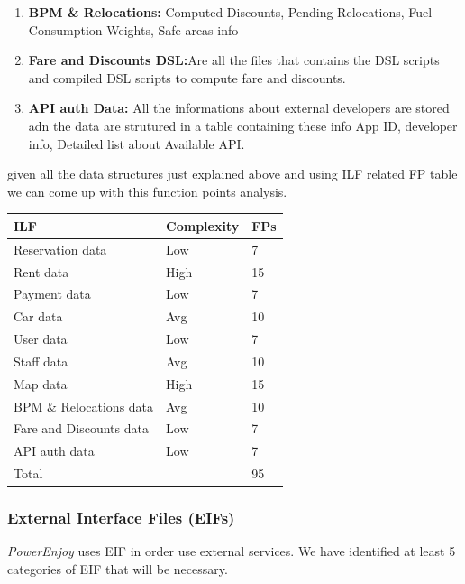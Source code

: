 \documentclass[english]{article}
\newenvironment{fpcounttable}[1]{
	\begin{center}
	\begin{longtable}{|l|l|l|}
	\hline 
	#1 & Complexity & FPs \\\hline
}{
	\end{longtable}\end{center}
}
\newcommand{\fptotal}[1]{
	\multicolumn{2}{|l|}{{Total}}
	& #1\\\hline
}
\newcommand{\powerenjoy}{\textit{PowerEnjoy }}
\newcommand{\ilh}{ & High & 15}
\newcommand{\ila}{ & Avg & 10}
\newcommand{\ill}{ & Low & 7}
\begin{document}
\begin {enumerate}
\begin{figure}[H]
				\caption{Map data Structure}
				\label{fig:mapStruct}
			\end{figure}
	\item  \textbf{BPM \& Relocations:} Computed Discounts, Pending Relocations, Fuel Consumption Weights, Safe areas info 
	\item  \textbf{Fare and Discounts DSL:}Are all the files that contains the DSL scripts and compiled DSL scripts to compute fare and discounts.
	\item  \textbf{API auth Data:} All the informations about external developers are stored adn the data are strutured in a table containing these info App ID, developer info,  Detailed list about Available API.
\end {enumerate}
given all the data structures just explained above and using ILF related FP table we can come up with this function points analysis.

\pagebreak
\begin{fpcounttable}{ILF}
Reservation data\ill\\
Rent data\ilh \\
Payment data\ill\\
Car data\ila \\
User data \ill\\
Staff data\ila \\
Map data\ilh \\
BPM \& Relocations data\ila\\
Fare and Discounts data \ill\\
API auth data\ill\\\hline
\fptotal{95}	
\end{fpcounttable}

\subsubsection{External Interface Files (EIFs)}
\powerenjoy uses EIF in order use external services.
We have identified at least 5 categories of EIF that will be necessary.
\end{document}
